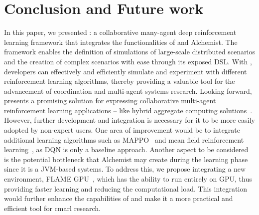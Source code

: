 \section{Conclusion and Future work}\label{conclusion}
In this paper, we presented \scarlib{}: 
 a collaborative many-agent deep reinforcement learning framework that integrates the functionalities of \scafi{} and Alchemist.
%
 The framework enables the definition of simulations of large-scale distributed scenarios 
 and the creation of complex scenarios with ease through its exposed DSL. 
% 
With \scarlib{}, developers can effectively and efficiently simulate and experiment with different reinforcement learning algorithms, 
 thereby providing a valuable tool for the advancement of coordination and multi-agent systems research.
Looking forward, \scarlib{} presents a promising solution 
 for expressing collaborative multi-agent reinforcement learning applications -- like hybrid aggregate computing solutions~\cite{Aguzzi2021,Aguzzi2022,Aguzzi2022-Roadmap,DBLP:conf/acsos/AguzziCV22}.
 However, further development and integration is necessary for it to be more easily adopted by non-expert users. 
 One area of improvement would be to integrate additional learning algorithms such as MAPPO~\cite{mappo} and mean field reinforcement learning~\cite{meanfield}, 
 as DQN is only a baseline approach.
%
Another aspect to be considered is the potential bottleneck that Alchemist may create during the learning phase since it is a JVM-based systems. 
%
To address this, we propose integrating a new environment, FLAME GPU~\cite{flame}, 
which has the ability to run entirely on GPU, 
thus providing faster learning and reducing the computational load. 
%
This integration would further enhance the capabilities of \scarlib{} and make it a more practical and efficient tool for \ac{cmarl} research.



%
%
%
\printbibliography
